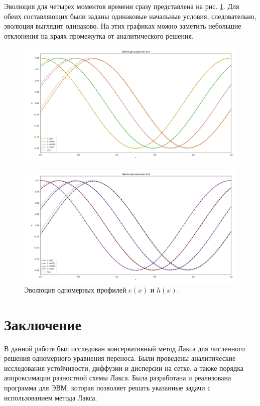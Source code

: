 \documentclass[12pt,a4paper]{article}
\begin{document}
	Эволюция для четырех моментов времени сразу представлена на рис. \ref{fig:eh_evol}. Для обеих составляющих были заданы одинаковые начальные условия, следовательно, эволюция выглядит одинаково. На этих графиках можно заметить небольшие отклонения на краях промежутка от аналитического решения.
	\begin{figure}[!h]
		\centering
		\includegraphics[width=17cm\linewidth]{figures/addd/evol_e.png}
	\end{figure}
	\begin{figure}[!h]
		\centering
		\includegraphics[width=17cm\linewidth]{figures/addd/evol_h.png}
		\caption{Эволюция одномерных профилей $e(x)$ и $h(x)$.}
		\label{fig:eh_evol}
	\end{figure}
	
	
	
	\newpage
	\section{Заключение}
	В данной работе был исследован консервативный метод Лакса для численного решения одномерного уравнения переноса. Были проведены аналитические исследования устойчивости, диффузии и дисперсии на сетке, а также порядка аппроксимации разностной схемы Лакса. Была разработана и реализована программа для ЭВМ, которая позволяет решать указанные задачи с использованием метода Лакса.
	
\end{document}
